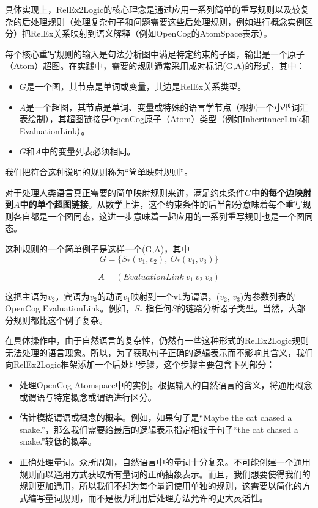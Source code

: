 具体实现上，RelEx2Logic的核心理念是通过应用一系列简单的重写规则以及较复杂的后处理规则（处理复杂句子和问题需要这些后处理规则，例如进行概念实例区分）把RelEx关系映射到语义解释（例如OpenCog的AtomSpace表示）。

每个核心重写规则的输入是句法分析图中满足特定约束的子图，输出是一个原子（Atom）超图。在实践中，需要的规则通常采用成对标记(G,A)的形式，其中：

\begin{itemize}
\item $G$是一个图，其节点是单词或变量，其边是RelEx关系类型。
\item  $A$是一个超图，其节点是单词、变量或特殊的语言学节点（根据一个小型词汇表绘制），其超图链接是OpenCog原子（Atom）类型（例如InheritanceLink和EvaluationLink）。
\item $G$和$A$中的变量列表必须相同。
\end{itemize}

我们把符合这种说明的规则称为“简单映射规则”。

对于处理人类语言真正需要的简单映射规则来讲，满足约束条件{\bf $G$中的每个边映射到$A$中的单个超图链接}。从数学上讲，这个约束条件的后半部分意味着每个重写规则各自都是一个图同态\cite{Voloshin2009}，这进一步意味着一起应用的一系列重写规则也是一个图同态。

这种规则的一个简单例子是这样一个(G,A)，其中
$$
G = \{ S_*(v_1,v_2), \ O_*(v_1, v_3) \}
$$

$$
A = (EvaluationLink \ v_1 \ v_2 \ v_3)
$$

这把主语为$v_2$，宾语为$v_3$的动词$v_1$映射到一个v1为谓语，($v_2$, $v_3$)为参数列表的OpenCog EvaluationLink。例如，$S_*$ 指任何$S$的链路分析器子类型。当然，大部分规则都比这个例子复杂。

在具体操作中，由于自然语言的复杂性，仍然有一些这种形式的RelEx2Logic规则无法处理的语言现象。所以，为了获取句子正确的逻辑表示而不影响其含义，我们向RelEx2Logic框架添加一个后处理步骤，这个步骤主要包含下列部分：

\begin{itemize}
\item 处理OpenCog Atomspace中的实例。根据输入的自然语言的含义，将通用概念或谓语与特定概念或谓语进行区分。
\item 估计模糊谓语或概念的概率。例如，如果句子是“Maybe the cat chased a snake.”，那么我们需要给最后的逻辑表示指定相较于句子“the cat chased a snake.”较低的概率。
\item 正确处理量词。众所周知，自然语言中的量词十分复杂。不可能创建一个通用规则而以通用方式获取所有量词的正确抽象表示。而且，我们想要使得我们的规则更加通用，所以我们不想为每个量词使用单独的规则，这需要以简化的方式编写量词规则，而不是极力利用后处理方法允许的更大灵活性。
\end{itemize}

